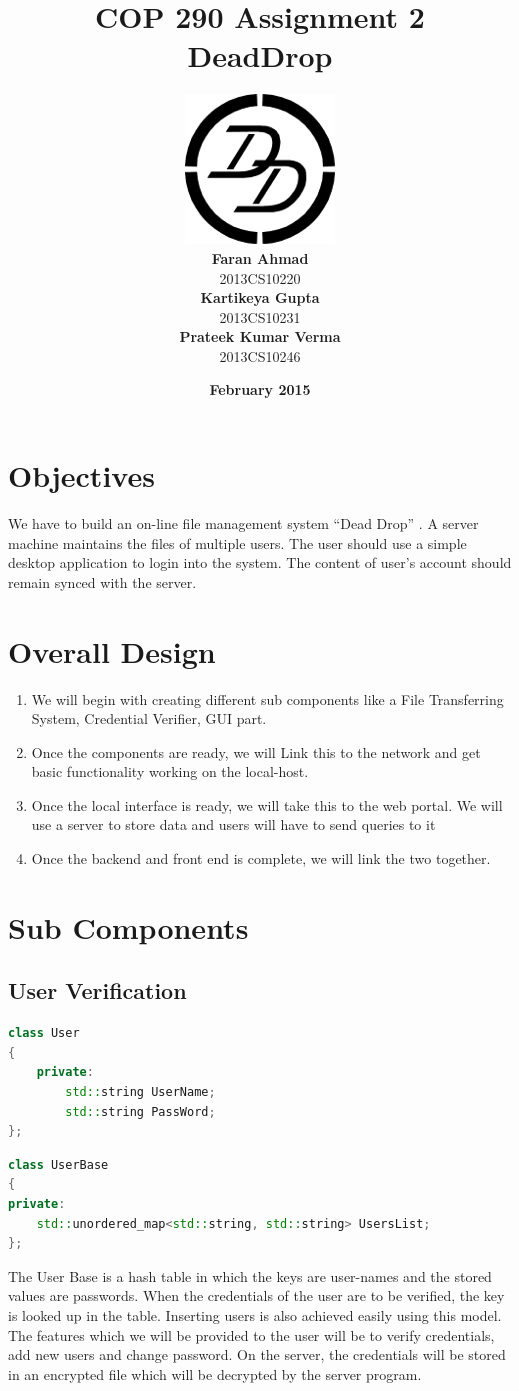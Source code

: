 \documentclass{article}
\title{\vspace*{\fill} \textbf{COP 290 Assignment 2}
	  \\ {\Large \textbf{DeadDrop}}
}
\author{
	\vspace{5mm} \includegraphics{ddlogo.png} \\
	 \textbf{Faran Ahmad}\\
	2013CS10220 \vspace{2mm} \\
	\textbf{Kartikeya Gupta}\\ 
	2013CS10231 \vspace{2mm} \\
	\textbf{Prateek Kumar Verma}\\ 
	2013CS10246
}
\date{\vspace{3mm} \textbf{February 2015} \vspace*{\fill}}
\begin{document}
	\maketitle

	\newpage

	\tableofcontents

	\newpage

	\section{Objectives}
	We have to build an on-line file management system ``Dead Drop'' . A server machine maintains the files of multiple users. The user should use a simple desktop application to login into the system. The content of user's account should remain synced with the server. 

	\section{Overall Design}
		\begin{enumerate}
			\item We will begin with creating different sub components like a File Transferring System, Credential Verifier, GUI part.
			\item Once the components are ready, we will Link this to the network and get basic functionality working on the local-host.
			\item Once the local interface is ready, we will take this to the web portal. We will use a server to store data and users will have to send queries to it
			\item Once the backend and front end is complete, we will link the two together.
		\end{enumerate}

	\section{Sub Components}

			\subsection{User Verification}
			\begin{lstlisting}[language=C++, caption={Class Parameters for User}]
class User
{
	private:
		std::string UserName;
		std::string PassWord;	
};
			\end{lstlisting}
			\begin{lstlisting}[language=C++, caption={Class Parameters for UserBase}]
class UserBase
{
private:
	std::unordered_map<std::string, std::string> UsersList;
};
			\end{lstlisting}
			The User Base is a hash table in which the keys are user-names and the stored values are passwords. When the credentials of the user are to be verified, the key is looked up in the table. Inserting users is also achieved easily using this model. The features which we will be provided to the user will be to verify credentials, add new users and change password. On the server, the credentials will be stored in an encrypted file which will be decrypted by the server program.
\end{document}
